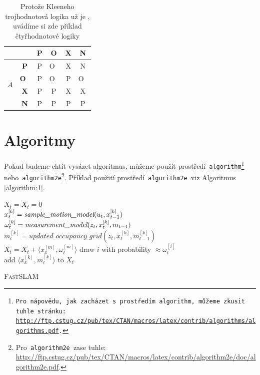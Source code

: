 \documentclass[a4paper, 11pt, ]{article}
\begin{document}
\begin{table}[h]
\begin{center}
\begin{tabular}{|c|>{\bfseries}c|c|c|c|c|}
            \multicolumn{2}{|c|}{} & \textbf{P} & \textbf{O} & \textbf{X} & \textbf{N} \\ 
            \hline 
            \multirow{4}{*}{$A$}
            & P & P & O~& X & N \\ \cline{2-6} 
            & O~& P & O~& P & O~\\ \cline{2-6}
            & X & P & P & X & X \\ \cline{2-6}
            & N & P & P & P & P \\ \cline{2-6}
            \hline 
        \end{tabular}
    \caption{Protože Kleeneho trojhodnotová logika už je , uvádíme si zde příklad čtyřhodnotové logiky}
    \label{table:2}
    \end{center}
\end{table}
\pagebreak
\section{Algoritmy}
\label{section:algorithm}
Pokud budeme chtít vysázet algoritmus, můžeme použít prostředí\texttt{ algorithm\footnote{Pro nápovědu, jak zacházet s~prostředím\texttt{ algorithm,} můžeme zkusit tuhle stránku:\\
\href{http://ftp.cstug.cz/pub/tex/CTAN/macros/latex/contrib/algorithms/algorithms.pdf}{http://ftp.cstug.cz/pub/tex/CTAN/macros/latex/contrib/algorithms/algorithms.pdf}.} }
nebo\texttt{ algorithm2e}\footnote{Pro\texttt{ algorithm2e }zase tuhle:
\href{http://ftp.cstug.cz/pub/tex/CTAN/macros/latex/contrib/algorithm2e/doc/algorithm2e.pdf}{http://ftp.cstug.cz/pub/tex/CTAN/macros/latex/contrib/algorithm2e/doc/algorithm2e.pdf}.}.
Příklad použití prostředí\texttt{ algorithm2e }viz Algoritmus \ref{algorithm:1}.
\bigskip
\IncMargin{1.5em}
\begin{algorithm}
\SetNlSty{}{}{:}
\SetNlSkip{0.5em}
\SetInd{1em}{1em}
\Indm\Indmm
{}
\Indpp\Indp
\BlankLine
$\overline{X_t}=X_t=0$ \\
{$x_t^{[k]}=\emph{sample\_motion\_model}(u_t, x_{t-1}^{[k]})$\\
$\omega_t^{[k]}=\emph{measurement\_model}(z_t, x_t^{[k]}, m_{t-1})$\\
$m_t^{[k]}=updated\_occupancy\_grid(z_t, x_t^{[k]}, m_{t-1}^{[k]})$\\
$\overline{X_t}=\overline{X_t}+\langle x_x^{[m]},\omega_t^{[m]} \rangle$}
{draw $i$ with probability $\approx \omega_t^{[i]}$\\
add $\langle x_x^{[k]}, m_t^{[k]}\rangle \textrm{ to } X_t$}
\caption{\textsc{FastSLAM}}
\label{algorithm:1}
\end{algorithm}
\DecMargin{1.5em}
\end{document}
